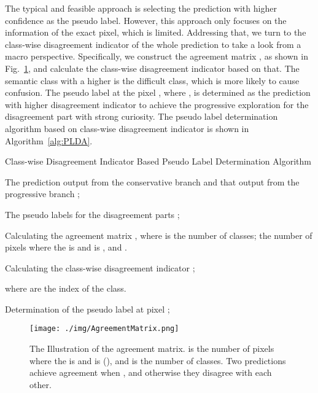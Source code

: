 \documentclass[journal]{IEEEtran}
\begin{document}
The typical and feasible approach is selecting the prediction with higher confidence as the pseudo label. However, this approach only focuses on the information of 
the exact pixel, which is limited. Addressing that, we turn to the class-wise disagreement indicator of the whole prediction to take a look from a macro perspective. 
Specifically, we construct the agreement matrix , as shown in Fig.~\ref{fig:AM}, and calculate the class-wise disagreement indicator 
 based on that. The semantic class with a higher  is the difficult class, which is more likely to cause confusion. The pseudo label at the pixel , 
where , is determined as the prediction with higher disagreement indicator to achieve the progressive exploration for the disagreement part 
with strong curiosity. The pseudo label determination algorithm based on class-wise disagreement indicator is shown in Algorithm~\ref{alg:PLDA}.

\begin{algorithm}[ht]
  \caption{Class-wise Disagreement Indicator Based Pseudo Label Determination Algorithm}
  \label{alg:PLDA}
  \begin{algorithmic}[1]
    \Statex
    \Require
      The prediction output from the conservative branch  and that output from the progressive branch ;
      \Statex

    \Ensure
      The pseudo labels for the disagreement parts ;
    \Statex 

    \State Calculating the agreement matrix , where  is the number of classes;
    \Statex 
    \Statex  the number of pixels where the  is  and  is , and .
    \Statex 

    \State Calculating the class-wise disagreement indicator ;
    \Statex 
    \Statex \centerline{}
    \Statex \centerline{}
    \Statex where  are the index of the class.
    \Statex 

    \State Determination of the pseudo label at pixel ;
    \Statex 
    

  \end{algorithmic}
\end{algorithm}

\begin{figure}[h]
  \centering
  \texttt{[image: ./img/AgreementMatrix.png]}
  \caption{The Illustration of the agreement matrix.  is the number of pixels where the  is  and  is  (), and  is 
  the number of classes. Two predictions achieve agreement when , and otherwise they disagree with each other.}
  \label{fig:AM}
\end{figure}
\end{document}
